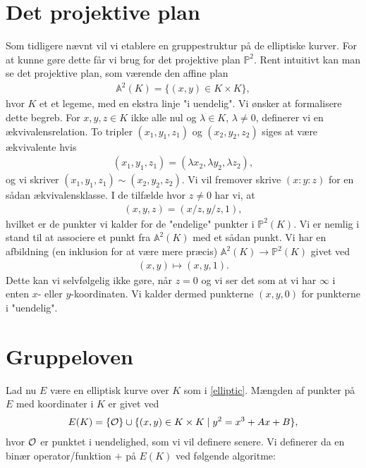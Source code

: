 \section{Det projektive plan}
Som tidligere nævnt vil vi etablere en gruppestruktur på de elliptiske
kurver. For at kunne gøre dette får vi brug for det projektive plan 
$\mathbb{P}^2$. Rent intuitivt kan man se det projektive plan, som
værende den affine plan 
\begin{align*}
	\mathbb{A}^2(K) = \{ (x, y) \in K \times K \},
\end{align*}
hvor $K$ et et legeme, med en ekstra linje "i uendelig". 
Vi ønsker at formalisere dette begreb. 
For $x, y, z \in K$ ikke alle nul og $\lambda \in K$, $\lambda \neq 0$, 
definerer vi en ækvivalensrelation. To tripler $(x_1, y_1, z_1)$ og 
$(x_2, y_2, z_2)$ siges at være ækvivalente hvis 
\begin{align*}
	(x_1, y_1, z_1) = (\lambda x_2, \lambda y_2, \lambda z_2),
\end{align*}
og vi skriver $(x_1, y_1, z_1) \sim (x_2, y_2, z_2)$. Vi vil fremover skrive
$(x:y:z)$ for en sådan ækvivalensklasse. I de tilfælde hvor $z \neq 0$ har vi, at
\begin{align*}
	(x, y, z) = (x/z, y/z, 1),
\end{align*}
hvilket er de punkter vi kalder for de "endelige" punkter i $\mathbb{P}^2(K)$.
Vi er nemlig i stand til at associere et punkt fra $\mathbb{A}^2(K)$ med et sådan
punkt. Vi har en afbildning (en inklusion for at være mere præcis) 
$\mathbb{A}^2(K) \to \mathbb{P}^2(K)$ givet ved
\begin{align*}
	(x, y) \mapsto (x, y, 1).
\end{align*}
Dette kan vi selvfølgelig ikke gøre, når $z=0$ og vi ser det som at vi
har $\infty$ i enten $x$- eller $y$-koordinaten. Vi kalder dermed punkterne
$(x, y, 0)$ for punkterne i "uendelig".








\section{Gruppeloven}
Lad nu $E$ være en elliptisk kurve over $K$ som i \ref{elliptic}. Mængden
af punkter på $E$ med koordinater i $K$ er givet ved
\begin{align*}
	E(K) = \{ \mathcal{O} \} \cup \{ (x, y) \in K \times K \mid y^2 = x^3 + Ax + B \},
\end{align*}
hvor $\mathcal{O}$ er punktet i uendelighed, som vi vil definere senere. Vi definerer
da en binær operator/funktion $+$ på $E(K)$ ved følgende algoritme:

